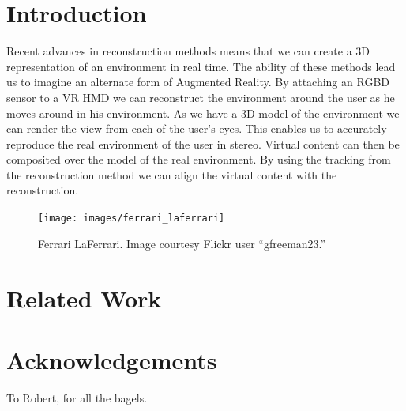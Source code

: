 \documentclass{acmsiggraph}
\begin{document}

%
%


\keywordlist

\conceptlist

\printcopyright

\section{Introduction}


Recent advances in reconstruction methods means that we can create a 3D representation of an environment in real time. The ability of these methods lead us to imagine an alternate form of Augmented Reality. By attaching an RGBD sensor to a VR HMD we can reconstruct the environment around the user as he moves around in his environment. As we have a 3D model of the environment we can render the view from each of the user's eyes. This enables us to accurately reproduce the real environment of the user in stereo. Virtual content can then be composited over the model of the real environment. By using the tracking from the reconstruction method we can align the virtual content with the reconstruction. 

\begin{figure}[ht]
	\centering
	\texttt{[image: images/ferrari\_laferrari]}
	\caption{Ferrari LaFerrari. Image courtesy Flickr user ``gfreeman23.''}
	\label{fig:ferrari}
\end{figure}
\section{Related Work}







\section*{Acknowledgements}

To Robert, for all the bagels.


\nocite{*}

\end{document}
